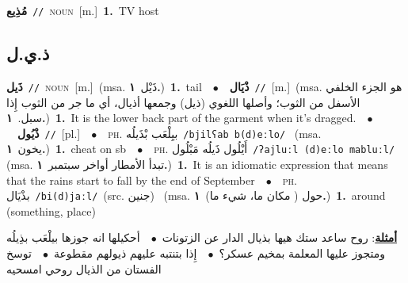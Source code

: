\documentclass[10pt,a4paper,twoside]{article} %
\begin{document}
\begin{multicols}{2}
{\setlength\topsep{0pt}\textbf{\foreignlanguage{arabic}{مُذِيع}}\ {\color{gray}\texttt{//}\color{black}}\ \textsc{noun}\ [m.]\ \textbf{1.}~TV host\ } \vspace{2mm}

\vspace{-3mm}
\subsection*{\color{blue}\foreignlanguage{arabic}{ذ.ي.ل}\color{blue}{}} 

{\setlength\topsep{0pt}\textbf{\foreignlanguage{arabic}{ذَيل}}\ {\color{gray}\texttt{//}\color{black}}\ \textsc{noun}\ [m.]\ \color{gray}(msa. \foreignlanguage{arabic}{ذَيْل}~\foreignlanguage{arabic}{\textbf{١.}})\color{black}\ \textbf{1.}~tail\ \ $\bullet$\ \ \setlength\topsep{0pt}\textbf{\foreignlanguage{arabic}{ذْيَال}}\ {\color{gray}\texttt{//}\color{black}}\ [m.]\ \color{gray}(msa. \foreignlanguage{arabic}{هو الجزء الخلفي الأسفل من الثوب؛ وأصلها اللغوي (ذيل) وجمعها أذيال، أي ما جر من الثوب إِذا سبل.}~\foreignlanguage{arabic}{\textbf{١.}})\color{black}\ \textbf{1.}~It is the lower back part of the garment when it's dragged.\ \ $\bullet$\ \ \setlength\topsep{0pt}\textbf{\foreignlanguage{arabic}{ذْيُول}}\ {\color{gray}\texttt{//}\color{black}}\ [pl.]\ \ $\bullet$\ \ \textsc{ph.} \color{gray} \foreignlanguage{arabic}{بيِلْعَب بْذَيلُه}\color{black}\ {\color{gray}\texttt{/{\sffamily bjilʕab b(d)eːlo}/}\color{black}}\ \color{gray} (msa. \foreignlanguage{arabic}{يخون}~\foreignlanguage{arabic}{\textbf{١.}})\color{black}\ \textbf{1.}~cheat on sb\ \ $\bullet$\ \ \textsc{ph.} \color{gray} \foreignlanguage{arabic}{أَيْلُول ذَيلُه مَبْلُول}\color{black}\ {\color{gray}\texttt{/{\sffamily ʔajluːl (d)eːlo mabluːl}/}\color{black}}\ \color{gray} (msa. \foreignlanguage{arabic}{تبدأ الأمطار أواخر سبتمبر}~\foreignlanguage{arabic}{\textbf{١.}})\color{black}\ \textbf{1.}~It is an idiomatic expression that means  that the rains start to fall by the end of September\ \ $\bullet$\ \ \textsc{ph.} \color{gray} \foreignlanguage{arabic}{بذْيَال}\color{black}\ {\color{gray}\texttt{/{\sffamily bi(d)jaːl}/}\color{black}}\ \color{gray}(src. \foreignlanguage{arabic}{جنين})\color{black}\ \color{gray} (msa. \foreignlanguage{arabic}{حول ( مكان ما، شيء ما)}~\foreignlanguage{arabic}{\textbf{١.}})\color{black}\ \textbf{1.}~around (something, place)\  \begin{flushright}\color{gray}\foreignlanguage{arabic}{\textbf{\underline{\foreignlanguage{arabic}{أمثلة}}}: روح ساعد ستك هيها بذيال الدار عن الزتونات\ $\bullet$\ \  أحكيلها انه جوزها بيلْعَب بذِيلُه ومتجوز عليها المعلمة بمخيم عسكر؟\ $\bullet$\ \  إِذا بتنتبه عليهم ذيولهم مقطوعة\ $\bullet$\ \  توسخ الفستان من الذيال روحي امسحيه}\end{flushright}\color{black}} \vspace{2mm}


\end{multicols}
\end{document}
